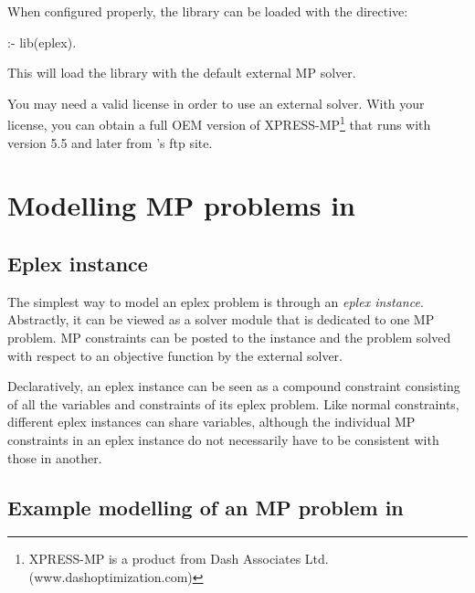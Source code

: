 
When configured properly, the library can be loaded with the directive:

\begin{code}
:- lib(eplex).
\end{code}

\noindent
This will load the library with the default external MP solver.

You may need a valid license in order to use an external solver. With your
{\eclipse} license, you can obtain a full OEM version of
XPRESS-MP\footnote{XPRESS-MP is a product from Dash Associates
Ltd. (www.dashoptimization.com)} that
runs with {\eclipse} version 5.5 and later from {\eclipse}'s ftp site.

\section{Modelling MP problems in {\eclipse}}
\label{mpmodelling}

\subsection{Eplex instance}

The simplest way to model an eplex problem is through an {\it eplex
instance}. Abstractly, it can be viewed as a solver module that is
dedicated to one MP problem. MP constraints can be posted to the instance 
and the problem solved with respect to an objective function by the
external solver.

Declaratively, an eplex instance can be
seen as a compound constraint consisting of all the variables and
constraints of its eplex problem. Like normal constraints, different eplex
instances can share variables, although the individual MP constraints in
an eplex instance do not necessarily have to be consistent with those in
another. 


\subsection{Example modelling of an MP problem in {\eclipse}}

